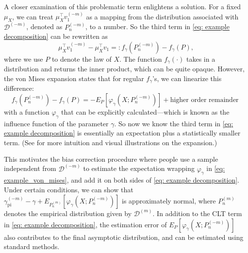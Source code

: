 \documentclass[11pt]{article}
\newenvironment{revblock}
  {\color{teal}}
  {}
\begin{document}
\begin{revblock}
A closer examination of this problematic term enlightens a solution. For a fixed $\mu_X$, we can treat $\mu_X^\top v_1^{(-m)}$ as a mapping from the distribution associated with $\mathcal{D}^{(-m)}$, denoted as $P_n^{(-m)}$, to a number. So the third term in \eqref{eq: example decomposition} can be rewritten as
\begin{equation*}
\mu_X^{\top}v_1^{(-m)}-\mu_X^{\top}v_1 =: f_\gamma(P_n^{(-m)}) - f_\gamma(P),
\end{equation*}
where we use $P$ to denote the law of $X$. The function $f_{\gamma}(\cdot)$ takes in a distribution and returns the inner product, which can be quite opaque. However, the von Mises expansion states that for regular $f_{\gamma}$'s, we can linearize this difference:
\begin{equation}\label{eq: example_von_mises}
   f_\gamma(P_n^{(-m)}) - f_\gamma(P) = -E_P[\varphi_\gamma(X;P_n^{(-m)})] + \text{higher order remainder }
\end{equation}
with a function $\varphi_\gamma$ that can be explicitly calculated---which is known as the influence function of the parameter $\gamma$. So now we know the third term in \eqref{eq: example decomposition} is essentially an expectation plus a statistically smaller term. (See \cite{fisher2021visually} for more intuition and visual illustrations on the expansion.)
\end{revblock}

This motivates the bias correction procedure where people use a sample independent from $\mathcal{D}^{(-m)}$ to estimate the expectation wrapping $\varphi_\gamma$ in \eqref{eq: example_von_mises}, and add it on both sides of \eqref{eq: example decomposition}. Under certain conditions, we can show that 
$
\gamma_{\mathrm{pi}}^{(-m)}-\gamma+E_{P_n^{(m)}}\left[\varphi_\gamma\left(X ; P_n^{(-m)}\right)\right]
$
is approximately normal, where $P_n^{(m)}$ denotes the empirical distribution given by $\mathcal D^{(m)}$. In addition to the CLT term in \eqref{eq: example decomposition}, the estimation error of $E_P\left[\varphi_\gamma\left(X ; P_n^{(-m)}\right)\right]$ also contributes to the final asymptotic distribution, and can be estimated using standard methods. 
\end{document}

